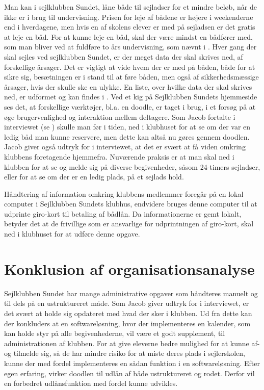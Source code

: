 Man kan i sejlklubben Sundet, låne både til sejladser for et mindre beløb, når de ikke er i brug til undervisning.
Prisen for leje af bådene er højere i weekenderne end i hverdagene, men hvis en af skolens elever er med på sejladsen er
det gratis at leje en båd. For at kunne leje en båd, skal der være mindst en bådfører med, som man bliver ved at
fuldføre to års undervisning, som nævnt i  \citep{Sundet}. Hver gang der skal sejles ved
sejlklubben Sundet, er der meget data der skal skrives ned, af forskellige årsager. Det er vigtigt at vide hvem der er
med på båden, både for at sikre sig, besætningen er i stand til at føre båden, men også af sikkerhedsmæssige årsager,
hvis der skulle ske en ulykke. En liste, over hvilke data der skal skrives ned, er udformet og kan findes i
. Ved et kig på Sejlklubben Sundets hjemmeside \citep{SundetUdlaan} ses det, at forskellige
værktøjer, bl.a. en doodle, er taget i brug, i et forsøg på at øge brugervenlighed og interaktion mellem deltagere. 
Som Jacob fortalte i interviewet (se ) skulle man før i tiden, ned i klubhuset for at se om der var
en ledig båd man kunne reservere, men dette kan altså nu gøres gennem doodlen. Jacob giver også udtryk for i
interviewet, at det er svært at få viden omkring klubbens foretagende hjemmefra. Nuværende praksis er at man skal ned i
klubben for at se og melde sig på diverse begivenheder, såsom 24-timers sejladser, eller for at se om der er en ledig
plads, på et sejlads hold.

Håndtering af information omkring klubbens medlemmer foregår på en lokal computer i Sejlklubben Sundets klubhus,
endvidere bruges denne computer til at udprinte giro-kort til betaling af bådlån. Da informationerne er gemt lokalt,
betyder det at de frivillige som er ansvarlige for udprintningen af giro-kort, skal ned i klubhuset for at udføre denne
opgave.


\section{Konklusion af organisationsanalyse}

Sejlklubben Sundet har mange administrative opgaver som håndteres manuelt og til dels på en ustruktureret måde. Som
Jacob giver udtryk for i interviewet, er det svært at holde sig opdateret med hvad der sker i klubben. Ud fra dette kan
der konkluders at en softwareløsning, hvor der implementeres en kalender, som kan holde styr på alle begivenhederne, vil
være et godt supplement, til administrationen af klubben. For at give eleverne bedre mulighed for at kunne af- og
tilmelde sig, så de har mindre risiko for at miste deres plads i sejlerskolen, kunne der med fordel implementeres en
sådan funktion i en softwareløsning. Efter egen erfaring, virker doodlen til udlån af både ustruktureret og rodet.
Derfor vil en forbedret udlånsfunktion med fordel kunne udvikles.

